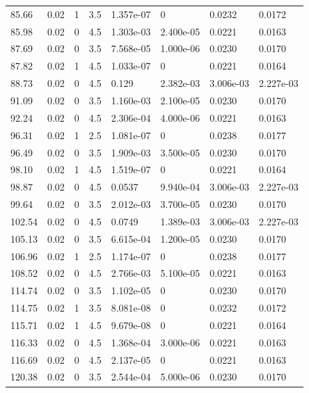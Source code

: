 \documentclass[preview]{standalone}
\begin{document}
{{{\begin{tabular}{L{1.2cm}C{1.2cm} C{0.3cm}C{0.5cm} C{1.4cm}C{1.4cm} C{1.4cm}C{1.4cm}}
  85.66  &  0.02  & 1     & 3.5 &  1.357e-07  & 0  & 0.0232 &  0.0172   \\ 
  85.98  &  0.02  & 0     & 4.5 &  1.303e-03  & 2.400e-05  & 0.0221 &  0.0163   \\ 
  87.69  &  0.02  & 0     & 3.5 &  7.568e-05  & 1.000e-06  & 0.0230 &  0.0170   \\ 
  87.82  &  0.02  & 1     & 4.5 &  1.033e-07  & 0  & 0.0221 &  0.0164   \\ 
  88.73  &  0.02  & 0     & 4.5 &  0.129  & 2.382e-03  & 3.006e-03 &  2.227e-03   \\ 
  91.09  &  0.02  & 0     & 3.5 &  1.160e-03  & 2.100e-05  & 0.0230 &  0.0170   \\ 
  92.24  &  0.02  & 0     & 4.5 &  2.306e-04  & 4.000e-06  & 0.0221 &  0.0163   \\ 
  96.31  &  0.02  & 1     & 2.5 &  1.081e-07  & 0  & 0.0238 &  0.0177   \\ 
  96.49  &  0.02  & 0     & 3.5 &  1.909e-03  & 3.500e-05  & 0.0230 &  0.0170   \\ 
  98.10  &  0.02  & 1     & 4.5 &  1.519e-07  & 0  & 0.0221 &  0.0164   \\ 
  98.87  &  0.02  & 0     & 4.5 &  0.0537  & 9.940e-04  & 3.006e-03 &  2.227e-03   \\ 
  99.64  &  0.02  & 0     & 3.5 &  2.012e-03  & 3.700e-05  & 0.0230 &  0.0170   \\ 
  102.54  &  0.02  & 0     & 4.5 &  0.0749  & 1.389e-03  & 3.006e-03 &  2.227e-03   \\ 
  105.13  &  0.02  & 0     & 3.5 &  6.615e-04  & 1.200e-05  & 0.0230 &  0.0170   \\ 
  106.96  &  0.02  & 1     & 2.5 &  1.174e-07  & 0  & 0.0238 &  0.0177   \\ 
  108.52  &  0.02  & 0     & 4.5 &  2.766e-03  & 5.100e-05  & 0.0221 &  0.0163   \\ 
  114.74  &  0.02  & 0     & 3.5 &  1.102e-05  & 0  & 0.0230 &  0.0170   \\ 
  114.75  &  0.02  & 1     & 3.5 &  8.081e-08  & 0  & 0.0232 &  0.0172   \\ 
  115.71  &  0.02  & 1     & 4.5 &  9.679e-08  & 0  & 0.0221 &  0.0164   \\ 
  116.33  &  0.02  & 0     & 4.5 &  1.368e-04  & 3.000e-06  & 0.0221 &  0.0163   \\ 
  116.69  &  0.02  & 0     & 4.5 &  2.137e-05  & 0  & 0.0221 &  0.0163   \\ 
  120.38  &  0.02  & 0     & 3.5 &  2.544e-04  & 5.000e-06  & 0.0230 &  0.0170   \\ 

\end{tabular}}}}
\end{document}
